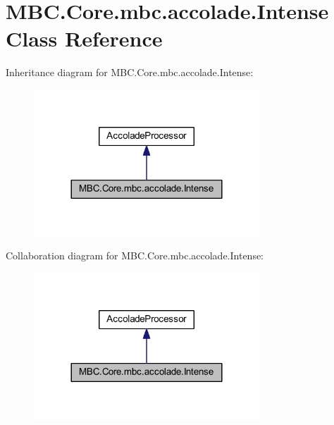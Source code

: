 \hypertarget{class_m_b_c_1_1_core_1_1mbc_1_1accolade_1_1_intense}{\section{M\-B\-C.\-Core.\-mbc.\-accolade.\-Intense Class Reference}
\label{class_m_b_c_1_1_core_1_1mbc_1_1accolade_1_1_intense}
}


Inheritance diagram for M\-B\-C.\-Core.\-mbc.\-accolade.\-Intense\-:\nopagebreak
\begin{figure}[H]
\begin{center}
\leavevmode
\includegraphics[width=240pt]{class_m_b_c_1_1_core_1_1mbc_1_1accolade_1_1_intense__inherit__graph}
\end{center}
\end{figure}


Collaboration diagram for M\-B\-C.\-Core.\-mbc.\-accolade.\-Intense\-:\nopagebreak
\begin{figure}[H]
\begin{center}
\leavevmode
\includegraphics[width=240pt]{class_m_b_c_1_1_core_1_1mbc_1_1accolade_1_1_intense__coll__graph}
\end{center}
\end{figure}

